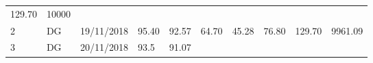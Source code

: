 \documentclass[
  11pt,
]{article}
\begin{document}
\begin{longtable}[]{@{}llllllllll@{}}
\begin{minipage}[t]{0.13\columnwidth}
129.70\strut
\end{minipage} & \begin{minipage}[t]{0.08\columnwidth}\raggedright
10000\strut
\end{minipage}\tabularnewline
\begin{minipage}[t]{0.04\columnwidth}\raggedright
2\strut
\end{minipage} & \begin{minipage}[t]{0.09\columnwidth}\raggedright
DG\strut
\end{minipage} & \begin{minipage}[t]{0.10\columnwidth}\raggedright
19/11/2018\strut
\end{minipage} & \begin{minipage}[t]{0.06\columnwidth}\raggedright
95.40\strut
\end{minipage} & \begin{minipage}[t]{0.06\columnwidth}\raggedright
92.57\strut
\end{minipage} & \begin{minipage}[t]{0.06\columnwidth}\raggedright
64.70\strut
\end{minipage} & \begin{minipage}[t]{0.06\columnwidth}\raggedright
45.28\strut
\end{minipage} & \begin{minipage}[t]{0.06\columnwidth}\raggedright
76.80\strut
\end{minipage} & \begin{minipage}[t]{0.13\columnwidth}\raggedright
129.70\strut
\end{minipage} & \begin{minipage}[t]{0.08\columnwidth}\raggedright
9961.09\strut
\end{minipage}\tabularnewline
\begin{minipage}[t]{0.04\columnwidth}\raggedright
3\strut
\end{minipage} & \begin{minipage}[t]{0.09\columnwidth}\raggedright
DG\strut
\end{minipage} & \begin{minipage}[t]{0.10\columnwidth}\raggedright
20/11/2018\strut
\end{minipage} & \begin{minipage}[t]{0.06\columnwidth}\raggedright
93.5\strut
\end{minipage} & \begin{minipage}[t]{0.06\columnwidth}\raggedright
91.07\strut
\end{minipage} & \begin{minipage}[t]{0.06\columnwidth}\raggedright

\end{minipage}
\end{longtable}
\end{document}
